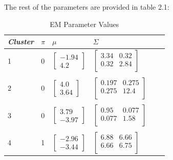 \documentclass[paper=a4, fontsize=11pt]{scrartcl} %
\numberwithin{equation}{section} %
\numberwithin{figure}{section} %
\numberwithin{table}{section} %
\begin{document}
The rest of the parameters are provided in table 2.1:

	\begin{table}
		\caption {EM Parameter Values} \label{tab:title} 
		\begin{center}		
			\begin{tabular}{*6l}   
				\toprule
				\emph{Cluster}&  $\pi$ & $\mu$  & $\Sigma$ \\\midrule
				1 & 0 
				& $\begin{bmatrix}-1.94
				 \\  4.2
				 \end{bmatrix}$  
				& $\begin{bmatrix}
				3.34 & 0.32\\
				0.32 & 2.84 \\ \end{bmatrix}$					
				\\ \\
				2 & 0
				& $\begin{bmatrix}4.0 \\ 3.64
				\end{bmatrix}$ 
				& $\begin{bmatrix}
				0.197 & 0.275 \\
				0.275 & 12.4 \\ \end{bmatrix}$	
				\\ \\
				3 & 0 
				& $\begin{bmatrix} 3.79
				 \\ -3.97
				 \end{bmatrix}$ 
				& $\begin{bmatrix}
				0.95 & 0.077\\
				0.077 & 1.58 \\ \end{bmatrix}$	
				\\ \\
				4 & 1
				& $\begin{bmatrix}-2.96
				 \\ -3.44
				 \end{bmatrix}$ 
				& $\begin{bmatrix}
				6.88 & 6.66 \\
				6.66 & 6.75 \\ \end{bmatrix}$
				\\\bottomrule
				\hline
			\end{tabular}
		\end{center}
	\end{table}
	
\end{document}
